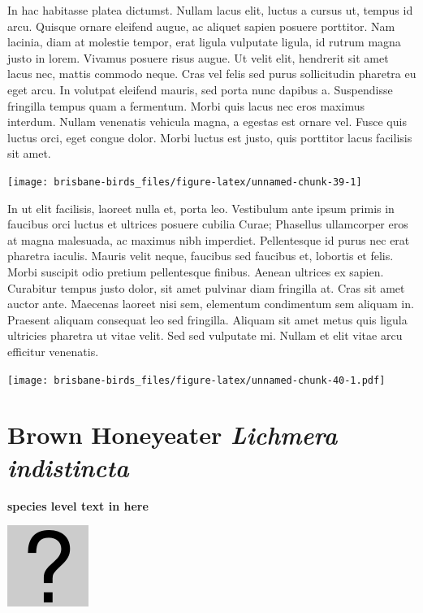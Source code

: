 \documentclass[]{book}
\let\origfigure\figure
\let\endorigfigure\endfigure
\renewenvironment{figure}[1][2] {
  \expandafter\origfigure\expandafter[H]
} {
  \endorigfigure
}
\begin{document}
In hac habitasse platea dictumst. Nullam lacus elit, luctus a cursus ut,
tempus id arcu. Quisque ornare eleifend augue, ac aliquet sapien posuere
porttitor. Nam lacinia, diam at molestie tempor, erat ligula vulputate
ligula, id rutrum magna justo in lorem. Vivamus posuere risus augue. Ut
velit elit, hendrerit sit amet lacus nec, mattis commodo neque. Cras vel
felis sed purus sollicitudin pharetra eu eget arcu. In volutpat eleifend
mauris, sed porta nunc dapibus a. Suspendisse fringilla tempus quam a
fermentum. Morbi quis lacus nec eros maximus interdum. Nullam venenatis
vehicula magna, a egestas est ornare vel. Fusce quis luctus orci, eget
congue dolor. Morbi luctus est justo, quis porttitor lacus facilisis sit
amet.

\begin{figure}
\texttt{[image: brisbane-birds\_files/figure-latex/unnamed-chunk-39-1]} \caption{insert figure caption}\label{fig:unnamed-chunk-39}
\end{figure}

In ut elit facilisis, laoreet nulla et, porta leo. Vestibulum ante ipsum
primis in faucibus orci luctus et ultrices posuere cubilia Curae;
Phasellus ullamcorper eros at magna malesuada, ac maximus nibh
imperdiet. Pellentesque id purus nec erat pharetra iaculis. Mauris velit
neque, faucibus sed faucibus et, lobortis et felis. Morbi suscipit odio
pretium pellentesque finibus. Aenean ultrices ex sapien. Curabitur
tempus justo dolor, sit amet pulvinar diam fringilla at. Cras sit amet
auctor ante. Maecenas laoreet nisi sem, elementum condimentum sem
aliquam in. Praesent aliquam consequat leo sed fringilla. Aliquam sit
amet metus quis ligula ultricies pharetra ut vitae velit. Sed sed
vulputate mi. Nullam et elit vitae arcu efficitur venenatis.

\begin{figure}
\centering
\texttt{[image: brisbane-birds\_files/figure-latex/unnamed-chunk-40-1.pdf]}
\caption{\label{fig:unnamed-chunk-40}insert figure caption}
\end{figure}

\section{\texorpdfstring{Brown Honeyeater \emph{Lichmera
indistincta}}{Brown Honeyeater Lichmera indistincta}}\label{brown-honeyeater-lichmera-indistincta}

\textbf{species level text in here}

\begin{figure}
\centering
\includegraphics{assets/missing.png}
\caption{No image for species}
\end{figure}
\end{document}
